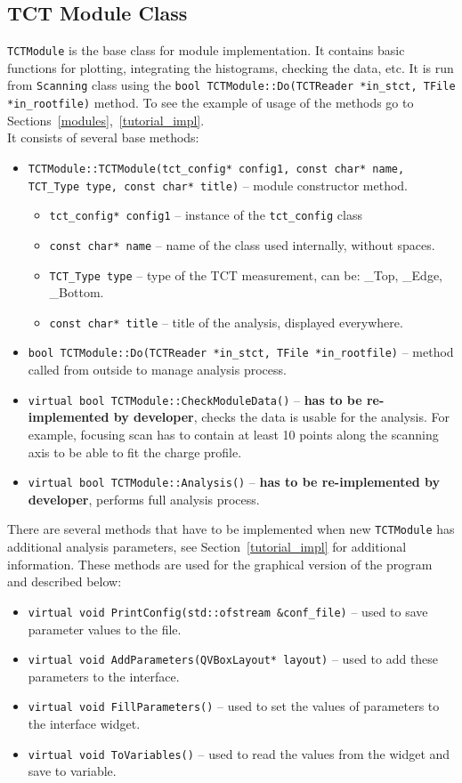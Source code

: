 \documentclass[12pt,oneside,notitlepage,abstracton,a4paper]{scrartcl}
\begin{document}
\subsection{TCT Module Class}\label{review:tct_module}

\lstinline$TCTModule$ is the base class for module implementation. It contains basic functions for plotting,  integrating the histograms, checking the data, etc. It is run from \lstinline$Scanning$ class using the \lstinline$bool TCTModule::Do(TCTReader *in_stct, TFile *in_rootfile)$ method. To see the example of usage of the methods go to Sections~\ref{modules},~\ref{tutorial_impl}.
\\ \indent It consists of several base methods:
\begin{itemize}
\item \lstinline$TCTModule::TCTModule(tct_config* config1, const char* name, TCT_Type type, const char* title)$ -- module constructor method.
\begin{itemize}
\item \lstinline$tct_config* config1$ -- instance of the \lstinline$tct_config$ class
\item \lstinline$const char* name$ -- name of the class used internally, without spaces.
\item \lstinline$TCT_Type type$ -- type of the TCT measurement, can be: \_Top, \_Edge, \_Bottom.
\item \lstinline$const char* title$ -- title of the analysis, displayed everywhere.
\end{itemize}
\item \lstinline$bool TCTModule::Do(TCTReader *in_stct, TFile *in_rootfile)$ -- method called from outside to manage analysis process.
\item \lstinline$virtual bool TCTModule::CheckModuleData()$ -- \textbf{has to be re-implemented by developer}, checks the data is usable for the analysis. For example, focusing scan has to contain at least 10 points along the scanning axis to be able to fit the charge profile.
\item \lstinline$virtual bool TCTModule::Analysis()$ -- \textbf{has to be re-implemented by developer}, performs full analysis process.
\end{itemize}

There are several methods that have to be implemented when new \lstinline$TCTModule$ has additional analysis parameters, see Section~\ref{tutorial_impl} for additional information. These methods are used for the graphical version of the program and described below:
\begin{itemize}
\item \lstinline$virtual void PrintConfig(std::ofstream &conf_file)$ -- used to save parameter values to the file.
\item \lstinline$virtual void AddParameters(QVBoxLayout* layout)$ -- used to add these parameters to the interface. 
\item \lstinline$virtual void FillParameters()$ -- used to set the values of parameters to the interface widget.
\item \lstinline$virtual void ToVariables()$ -- used to read the values from the widget and save to variable.
\end{itemize}
\end{document}

